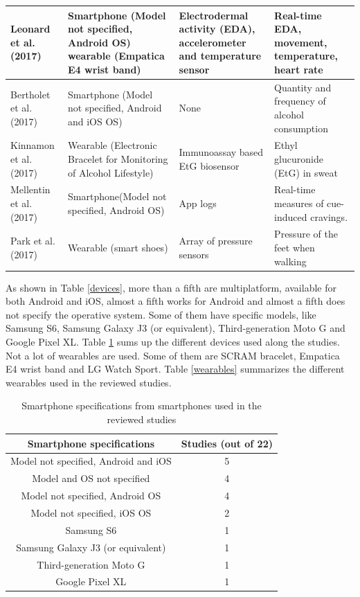 \begin{longtable}[h!]{||p{} | p{} | p{}| p{}||}
Leonard et al. (2017) \cite{Leonard2017} & Smartphone (Model not specified, Android OS) wearable (Empatica E4 wrist band) & Electrodermal activity (EDA), accelerometer and temperature sensor & Real-time EDA, movement, temperature, heart rate \\ \hline
Bertholet et al. (2017) \cite{Bertholet2017285} & Smartphone (Model not specified, Android and iOS OS) & None & Quantity and frequency of alcohol consumption \\ \hline
Kinnamon et al. (2017) \cite{Kinnamon2017} & Wearable (Electronic Bracelet for Monitoring of Alcohol Lifestyle) & Immunoassay based EtG biosensor & Ethyl glucuronide (EtG) in sweat \\ \hline
Mellentin et al. (2017) \cite{Mellentin2017} & Smartphone(Model not specified, Android OS) & App logs & Real-time measures of cue-induced cravings. \\ \hline
Park et al. (2017) \cite{Park201774} & Wearable (smart shoes) & Array of pressure sensors & Pressure of the feet when walking \\ \hline
\end{longtable}


As shown in Table \ref{devices}, more than a fifth are multiplatform, available for both Android and iOS, almost a fifth works for Android and almost a fifth does not specify the operative system. Some of them have specific models, like Samsung S6, Samsung Galaxy J3 (or equivalent), Third-generation Moto G and Google Pixel XL. Table \ref{smartphonespecifications} sums up the different devices used along the studies. Not a lot of wearables are used. Some of them are SCRAM bracelet, Empatica E4 wrist band and LG Watch Sport. Table \ref{wearables} summarizes the different wearables used in the reviewed studies.

\begin{table}[h!]
  \centering
 \begin{tabular}{||c | c ||}
 \hline
 \textbf{Smartphone specifications} & \textbf{Studies (out of 22)} \\ [0.5ex]
 \hline \hline
  Model not specified, Android and iOS &  5\\
  \hline
 Model and OS not specified & 4\\
 \hline
 Model not specified, Android OS & 4\\
 \hline
 Model not specified, iOS OS & 2\\
 \hline
 Samsung S6 & 1\\
 \hline
 Samsung Galaxy J3 (or equivalent) & 1\\
 \hline
 Third-generation Moto G & 1\\
 \hline
 Google Pixel XL & 1\\[0.5ex]
 \hline
\end{tabular}
\caption{Smartphone specifications from smartphones used in the reviewed studies}
\label{smartphonespecifications}
\end{table}

